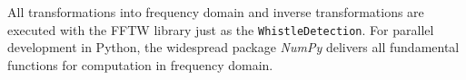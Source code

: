 All transformations into frequency domain and inverse transformations
are executed with the \ac{FFTW} library just as the \lstinline!WhistleDetection!.
For parallel development in Python, the widespread package \textit{NumPy} delivers
all fundamental functions for computation in frequency domain.






